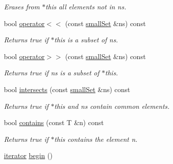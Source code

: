 \begin{CompactItemize}
\begin{CompactList}\small\item\em Erases from $\ast$this all elements not in ns. \item\end{CompactList}\item 
\hypertarget{classdai_1_1smallSet_6cd0a2ffbbad14020999cf11199e1e95}{
bool \hyperlink{classdai_1_1smallSet_6cd0a2ffbbad14020999cf11199e1e95}{operator$<$$<$} (const \hyperlink{classdai_1_1smallSet}{smallSet} \&ns) const }
\label{classdai_1_1smallSet_6cd0a2ffbbad14020999cf11199e1e95}

\begin{CompactList}\small\item\em Returns true if $\ast$this is a subset of ns. \item\end{CompactList}\item 
\hypertarget{classdai_1_1smallSet_49518998a31f63cf7a725937da3f2b6e}{
bool \hyperlink{classdai_1_1smallSet_49518998a31f63cf7a725937da3f2b6e}{operator$>$$>$} (const \hyperlink{classdai_1_1smallSet}{smallSet} \&ns) const }
\label{classdai_1_1smallSet_49518998a31f63cf7a725937da3f2b6e}

\begin{CompactList}\small\item\em Returns true if ns is a subset of $\ast$this. \item\end{CompactList}\item 
\hypertarget{classdai_1_1smallSet_c9180f866aa64a6021263a03ec4fab09}{
bool \hyperlink{classdai_1_1smallSet_c9180f866aa64a6021263a03ec4fab09}{intersects} (const \hyperlink{classdai_1_1smallSet}{smallSet} \&ns) const }
\label{classdai_1_1smallSet_c9180f866aa64a6021263a03ec4fab09}

\begin{CompactList}\small\item\em Returns true if $\ast$this and ns contain common elements. \item\end{CompactList}\item 
\hypertarget{classdai_1_1smallSet_82eff80e70adf8c0a541c0a505522b32}{
bool \hyperlink{classdai_1_1smallSet_82eff80e70adf8c0a541c0a505522b32}{contains} (const T \&n) const }
\label{classdai_1_1smallSet_82eff80e70adf8c0a541c0a505522b32}

\begin{CompactList}\small\item\em Returns true if $\ast$this contains the element n. \item\end{CompactList}\item 
\hypertarget{classdai_1_1smallSet_6a14836b896a8bb1901ea79fd45394d0}{
\hyperlink{classdai_1_1smallSet_254dd4f8cad9c7bce5522e9dbcfc4f49}{iterator} \hyperlink{classdai_1_1smallSet_6a14836b896a8bb1901ea79fd45394d0}{begin} ()}
\label{classdai_1_1smallSet_6a14836b896a8bb1901ea79fd45394d0}


\end{CompactItemize}
